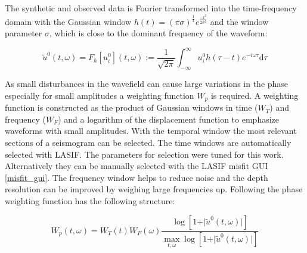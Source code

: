 The synthetic and observed data is Fourier transformed into the time-frequency domain with the Gaussian window
$h(t) = (\pi \sigma)^{\frac{1}{4}} e^{\frac{-t^2}{2 \sigma^2}}$
and the window parameter $\sigma$, which is close to the dominant frequency of the waveform:

\begin{equation}
\tilde{u}^0 (t, \omega) = F_h[u_i^0](t,\omega) := \frac{1}{\sqrt{2\pi}} \int_{-\infty}^{\infty} u_i^0 h(\tau - t) e^{-i \omega \tau} \mathrm{d}\tau
\end{equation}


As small disturbances in the wavefield can cause large variations in the phase especially for small amplitudes
a weighting function $W_p$ is required.
%
A weighting function is constructed as the product of Gaussian windows in time ($W_T$) and frequency ($W_F$) 
and a logarithm of the displacement function to emphasize waveforms with small amplitudes.
With the temporal window the most relevant sections of a seismogram can be selected. 
The time windows are automatically selected with LASIF. 
The parameters for selection were tuned for this work.
Alternatively they can be manually selected with the LASIF misfit GUI \autoref{misfit_gui}.
The frequency window helps to reduce noise and the depth resolution can be improved by weighing large frequencies up.
Following \citealp{Fichtner2009} the phase weighting function has the following structure:

\begin{equation}
W_p(t, \omega) = W_T(t) W_F(\omega) \frac{  \log[1 + \vert \tilde{u}^0 (t, \omega) \vert ] }
{\max_{t,\omega} \log  [1 + \vert \tilde{u}^0 (t, \omega) \vert ]}
\end{equation}





